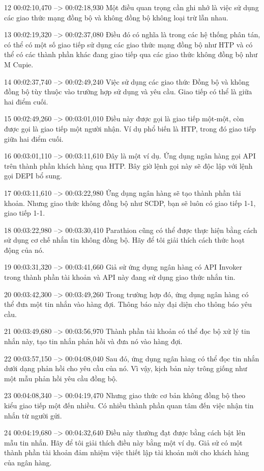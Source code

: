 12
00:02:10,470 --> 00:02:18,930
Một điều quan trọng cần ghi nhớ là việc sử dụng các giao thức mạng đồng bộ và không đồng bộ không loại trừ lẫn nhau.

13
00:02:19,320 --> 00:02:37,080
Điều đó có nghĩa là trong các hệ thống phân tán, có thể có một số giao tiếp sử dụng các giao thức mạng đồng bộ như HTP và có thể có các thành phần khác đang giao tiếp qua các giao thức không đồng bộ như M Cupie.

14
00:02:37,740 --> 00:02:49,240
Việc sử dụng các giao thức Đồng bộ và không đồng bộ tùy thuộc vào trường hợp sử dụng và yêu cầu.  Giao tiếp có thể là giữa hai điểm cuối.

15
00:02:49,260 --> 00:03:01,010
Điều này được gọi là giao tiếp một-một, còn được gọi là giao tiếp một người nhận.  Ví dụ phổ biến là HTP, trong đó giao tiếp giữa hai điểm cuối.

16
00:03:01,110 --> 00:03:11,610
Đây là một ví dụ.  Ứng dụng ngân hàng gọi API trên thành phần khách hàng qua HTP.  Bây giờ lệnh gọi này sẽ độc lập với lệnh gọi DEPI bổ sung.

17
00:03:11,610 --> 00:03:22,980
Ứng dụng ngân hàng sẽ tạo thành phần tài khoản.  Nhưng giao thức không đồng bộ như SCDP, bạn sẽ luôn có giao tiếp 1-1, giao tiếp 1-1.

18
00:03:22,980 --> 00:03:30,410
Parathion cũng có thể được thực hiện bằng cách sử dụng cơ chế nhắn tin không đồng bộ.  Hãy để tôi giải thích cách thức hoạt động của nó.

19
00:03:31,320 --> 00:03:41,660
Giả sử ứng dụng ngân hàng có API Invoker trong thành phần tài khoản và API này đang sử dụng giao thức nhắn tin.

20
00:03:42,300 --> 00:03:49,260
Trong trường hợp đó, ứng dụng ngân hàng có thể đưa một tin nhắn vào hàng đợi.  Thông báo này đại diện cho thông báo yêu cầu.

21
00:03:49,680 --> 00:03:56,970
Thành phần tài khoản có thể đọc bộ xử lý tin nhắn này, tạo tin nhắn phản hồi và đưa nó vào hàng đợi.

22
00:03:57,150 --> 00:04:08,040
Sau đó, ứng dụng ngân hàng có thể đọc tin nhắn dưới dạng phản hồi cho yêu cầu của nó.  Vì vậy, kịch bản này trông giống như một mẫu phản hồi yêu cầu đồng bộ.

23
00:04:08,340 --> 00:04:19,470
Nhưng giao thức cơ bản không đồng bộ theo kiểu giao tiếp một đến nhiều.  Có nhiều thành phần quan tâm đến việc nhận tin nhắn từ người gửi.

24
00:04:19,680 --> 00:04:32,640
Điều này thường đạt được bằng cách bật lên mẫu tin nhắn.  Hãy để tôi giải thích điều này bằng một ví dụ.  Giả sử có một thành phần tài khoản đảm nhiệm việc thiết lập tài khoản mới cho khách hàng của ngân hàng.

